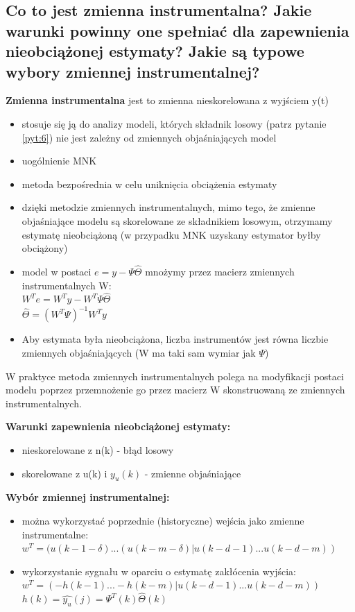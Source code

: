 \subsection{Co to jest zmienna instrumentalna? Jakie warunki powinny one spełniać dla zapewnienia nieobciążonej estymaty? Jakie są typowe wybory zmiennej instrumentalnej?}
\textbf{Zmienna instrumentalna} jest to zmienna nieskorelowana z wyjściem y(t)
\begin{itemize}
    \item stosuje się ją do analizy modeli, których składnik losowy (patrz pytanie \ref{pyt:6}) nie jest zależny od zmiennych objaśniających model
    \item uogólnienie MNK
    \item metoda bezpośrednia w celu uniknięcia obciążenia estymaty
    \item dzięki metodzie zmiennych instrumentalnych, mimo tego, że zmienne objaśniające modelu są skorelowane ze składnikiem losowym, otrzymamy estymatę nieobciążoną (w przypadku MNK uzyskany estymator byłby obciążony)
    \item model w postaci $e=y-\Psi\hat{\Theta}$ mnożymy przez macierz zmiennych instrumentalnych W:\mbox{}\\
    $W^Te = W^Ty - W^T\Psi\hat{\Theta}$\\
    $\hat{\Theta} = (W^T\Psi)^{-1}W^Ty$
    \item Aby estymata była nieobciążona, liczba instrumentów jest równa liczbie zmiennych objaśniających (W ma taki sam wymiar jak $\Psi$)
\end{itemize}

W praktyce metoda zmiennych instrumentalnych polega na modyfikacji postaci modelu poprzez przemnożenie go przez macierz W skonstruowaną ze zmiennych instrumentalnych.

\textbf{Warunki zapewnienia nieobciążonej estymaty:}
\begin{itemize}
    \item nieskorelowane z n(k) - błąd losowy
    \item skorelowane z u(k) i $y_u(k)$ - zmienne objaśniające
\end{itemize}

\textbf{Wybór zmiennej instrumentalnej:}
\begin{itemize}
    \item można wykorzystać poprzednie (historyczne) wejścia jako zmienne instrumentalne:\mbox{}\\
    $w^T = (u(k-1-\delta)...(u(k-m-\delta)|u(k-d-1)...u(k-d-m))$
    \item wykorzystanie sygnału w oparciu o estymatę zakłócenia wyjścia:\mbox{}\\
    $w^T = (-h(k-1)...-h(k-m)|u(k-d-1)...u(k-d-m))$\\
    $h(k) = \hat{y_u}(j) = \Psi^T(k)\hat{\Theta}(k)$
\end{itemize}

